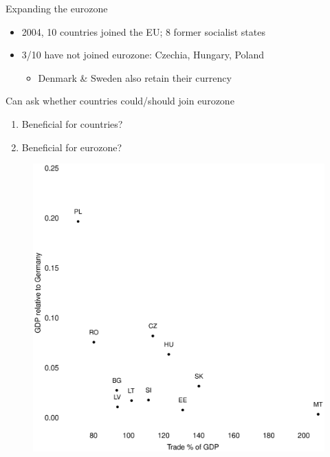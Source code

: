 \documentclass{beamer}
\begin{document}
\begin{frame}
  Expanding the eurozone
  \begin{itemize}
    \item 2004, 10 countries joined the EU; 8 former socialist states
    \item 3/10 have not joined eurozone: Czechia, Hungary, Poland
    \begin{itemize}
      \item Denmark \& Sweden also retain their currency
    \end{itemize}
  \end{itemize}
  \medskip
   Can ask whether countries could/should join eurozone
  \begin{enumerate}
    \item Beneficial for countries?
    \item Beneficial for eurozone?
  \end{enumerate}
\end{frame}

\begin{frame}
  \begin{figure}
    \includegraphics[scale=.3]{trade_new_members.eps}
  \end{figure}
\end{frame}
\end{document}
